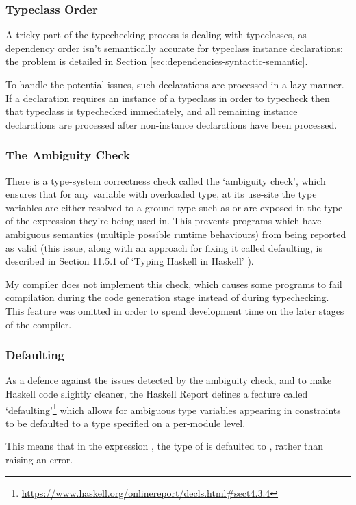 \documentclass[dissertation.tex]{subfiles}
\begin{document}
{{        \subsubsection{Typeclass Order}
        {
            A tricky part of the typechecking process is dealing with typeclasses, as dependency order isn't semantically accurate for typeclass instance declarations: the problem is detailed in Section \ref{sec:dependencies-syntactic-semantic}.
            
            To handle the potential issues, such declarations are processed in a lazy manner. If a declaration requires an instance of a typeclass in order to typecheck then that typeclass is typechecked immediately, and all remaining instance declarations are processed after non-instance declarations have been processed.
        }
        \subsubsection{The Ambiguity Check}
        {
            There is a type-system correctness check called the `ambiguity check', which ensures that for any variable with overloaded type, at its use-site the type variables are either resolved to a ground type such as  or are exposed in the type of the expression they're being used in. This prevents programs which have ambiguous semantics (multiple possible runtime behaviours) from being reported as valid (this issue, along with an approach for fixing it called defaulting, is described in Section 11.5.1 of `Typing Haskell in Haskell' \cite{THIH}). 

            My compiler does not implement this check, which causes some programs to fail compilation during the code generation stage instead of during typechecking. This feature was omitted in order to spend development time on the later stages of the compiler.
        }
        \subsubsection{Defaulting}
        {
            As a defence against the issues detected by the ambiguity check, and to make Haskell code slightly cleaner, the Haskell Report defines a feature called `defaulting'\footnote{\url{https://www.haskell.org/onlinereport/decls.html\#sect4.3.4}} which allows for ambiguous type variables appearing in  constraints to be defaulted to a type specified on a per-module level. 

            This means that in the expression , the type of  is defaulted to , rather than raising an error.

}}}
\end{document}
